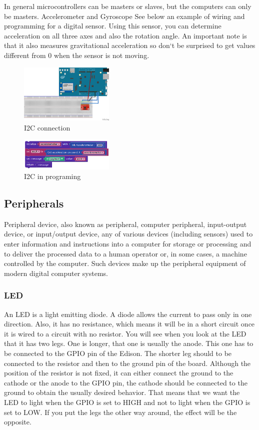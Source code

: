 In general microcontrollers can be masters or slaves, but the computers can only be masters. Accelerometer and Gyroscope 
See below an example of wiring and programming for a digital sensor.  
Using this sensor, you can determine acceleration on all three axes and also the rotation angle. An important note is that it also measures gravitational acceleration so don`t be surprised to get values different from 0 when the sensor is not moving.  

\begin{figure}[ht]
    \centering
    \includegraphics[width=0.4\textwidth]{figures/I2C connection.png}
    \caption{I2C connection}
\end{figure}
\begin{figure}[ht]
    \centering
    \includegraphics[width=0.4\textwidth]{figures/I2C in programing.png}
    \caption{I2C in programing}
\end{figure}

\subsection{Peripherals}
Peripheral device, also known as peripheral, computer peripheral, input-output device, or input/output device, any of various devices (including sensors) used to enter information and instructions into a computer for storage or processing and to deliver the processed data to a human operator or, in some cases, a machine controlled by the computer. Such devices make up the peripheral equipment of modern digital computer systems.

\subsubsection{LED}
An LED is a light emitting diode. A diode allows the current to pass only in one direction. Also, it has no resistance, which means it will be in a short circuit once it is wired to a circuit with no resistor. You will see when you look at the LED that it has two legs. One is longer, that one is usually the anode. This one has to be connected to the GPIO pin of the Edison. The shorter leg should to be connected to the resistor and then to the ground pin of the board.  
Although the position of the resistor is not fixed, it can either connect the ground to the cathode or the anode to the GPIO pin, the cathode should be connected to the ground to obtain the usually desired behavior. That means that we want the LED to light when the GPIO is set to HIGH and not to light when the GPIO is set to LOW. If you put the legs the other way around, the effect will be the opposite.  

